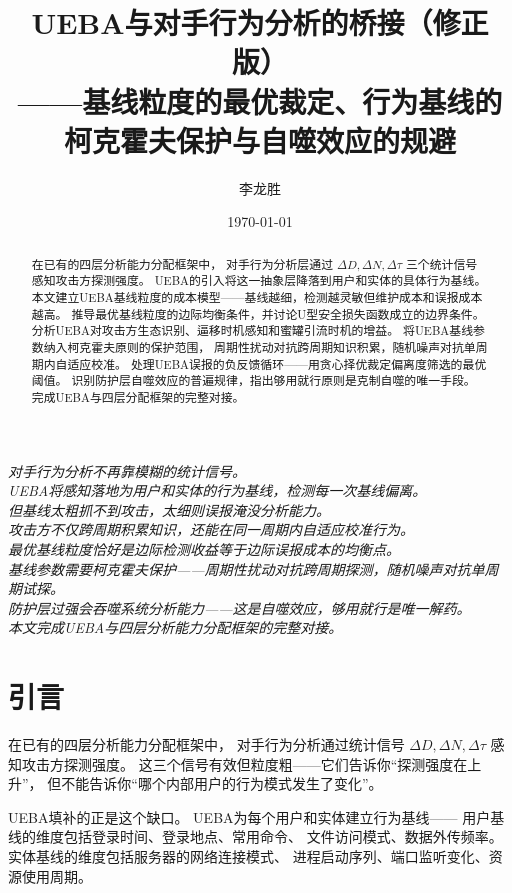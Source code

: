 \documentclass[11pt,a4paper]{article}
\title{UEBA与对手行为分析的桥接（修正版）\\
——基线粒度的最优裁定、行为基线的柯克霍夫保护与自噬效应的规避}
\author{李龙胜}
\date{\today}
\begin{document}
\maketitle

\begin{center}
\textit{
对手行为分析不再靠模糊的统计信号。\\
UEBA将感知落地为用户和实体的行为基线，检测每一次基线偏离。\\
但基线太粗抓不到攻击，太细则误报淹没分析能力。\\
攻击方不仅跨周期积累知识，还能在同一周期内自适应校准行为。\\
最优基线粒度恰好是边际检测收益等于边际误报成本的均衡点。\\
基线参数需要柯克霍夫保护——周期性扰动对抗跨周期探测，随机噪声对抗单周期试探。\\
防护层过强会吞噬系统分析能力——这是自噬效应，够用就行是唯一解药。\\
本文完成UEBA与四层分析能力分配框架的完整对接。
}
\end{center}

\vspace{5mm}

\begin{abstract}
在已有的四层分析能力分配框架中，
对手行为分析层通过 \(\Delta D, \Delta N, \Delta \tau\) 三个统计信号感知攻击方探测强度。
UEBA的引入将这一抽象层降落到用户和实体的具体行为基线。
本文建立UEBA基线粒度的成本模型——基线越细，检测越灵敏但维护成本和误报成本越高。
推导最优基线粒度的边际均衡条件，并讨论U型安全损失函数成立的边界条件。
分析UEBA对攻击方生态识别、逼移时机感知和蜜罐引流时机的增益。
将UEBA基线参数纳入柯克霍夫原则的保护范围，
周期性扰动对抗跨周期知识积累，随机噪声对抗单周期内自适应校准。
处理UEBA误报的负反馈循环——用贪心择优裁定偏离度筛选的最优阈值。
识别防护层自噬效应的普遍规律，指出够用就行原则是克制自噬的唯一手段。
完成UEBA与四层分配框架的完整对接。
\end{abstract}

\tableofcontents

\section{引言}

在已有的四层分析能力分配框架中，
对手行为分析通过统计信号 \(\Delta D, \Delta N, \Delta \tau\) 感知攻击方探测强度。
这三个信号有效但粒度粗——它们告诉你“探测强度在上升”，
但不能告诉你“哪个内部用户的行为模式发生了变化”。

UEBA填补的正是这个缺口。
UEBA为每个用户和实体建立行为基线——
用户基线的维度包括登录时间、登录地点、常用命令、
文件访问模式、数据外传频率。
实体基线的维度包括服务器的网络连接模式、
进程启动序列、端口监听变化、资源使用周期。
\end{document}
